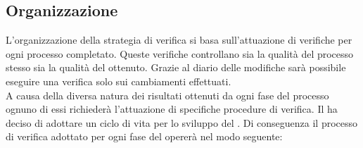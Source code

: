 	\subsection{Organizzazione}
	\label{sec:3.3}
		L'organizzazione della strategia di verifica si basa sull'attuazione di verifiche per ogni processo completato. Queste verifiche controllano sia la qualità del processo stesso sia la qualità del  ottenuto. Grazie al diario delle modifiche sarà possibile eseguire una verifica solo sui cambiamenti effettuati. \\
		A causa della diversa natura dei risultati ottenuti da ogni fase del processo ognuno di essi richiederà l'attuazione di specifiche procedure di verifica. Il  ha deciso di adottare un ciclo di vita  per lo sviluppo del . Di conseguenza il processo di verifica adottato per ogni fase del  opererà nel modo seguente:
